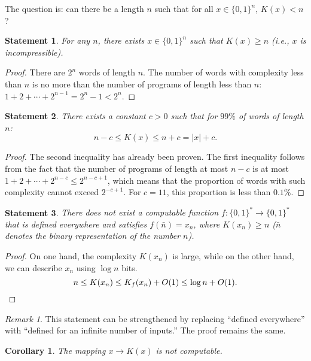 \documentclass[12pt,sans]{article}
\newcommand{\bits}{\{0,1\}}
\newcommand{\bitstr}{\bits^*}
\theoremstyle{definition}
\theoremstyle{plain}
\newtheorem{statement}{Statement}[section]
\newtheorem{corollary}{Corollary}[section]
\theoremstyle{remark}
\newtheorem{remark}{Remark}[section]
\begin{document}
The question is: can there be a length $n$ such that for all $x \in \{0,1\}^n$, $K(x) < n$?
\begin{statement}
    For any $n$, there exists $x \in \{0,1\}^n$ such that $K(x) \ge n$ (i.e., $x$ is incompressible).
\end{statement}
\begin{proof}
    There are $2^n$ words of length $n$. The number of words with complexity less than $n$ is no more than the number of programs of length less than $n$:
    \(
    1 + 2 + \dotsb + 2^{n-1} = 2^n - 1 < 2^n.
    \)\qedhere
\end{proof}

\begin{statement}
    There exists a constant $c > 0$ such that for $99\%$ of words of length $n$:
    \[
    n - c \le K(x) \le n + c = |x| + c.
    \]
\end{statement}
\begin{proof}
    The second inequality has already been proven. The first inequality follows from the fact that the number of programs of length at most $n - c$ is at most $1 + 2 + \dotsb + 2^{n-c} \le 2^{n - c + 1}$, which means that the proportion of words with such complexity cannot exceed $2^{-c + 1}$. For $c = 11$, this proportion is less than $0.1\%$.
\end{proof}

\begin{statement}
    There does not exist a computable function $f:\bitstr\to\bitstr$ that is
    defined everywhere and satisfies $f(\bar n) = x_n$, where $K(x_n) \ge n$ ($\bar n$ denotes the binary representation of the number $n$).
\end{statement}
\begin{proof} On one hand, the complexity $K(x_n)$ is large, while on the other hand, we can describe $x_n$ using $\log n$ bits.
    \[
    n \le K(x_n) \le K_f(x_n) + O(1) \le \log n + O(1). \qedhere
    \]
\end{proof}

\begin{remark}
    This statement can be strengthened by replacing ``defined everywhere'' with ``defined for an infinite number of inputs.'' The proof remains the same.
\end{remark}

\begin{corollary}
    The mapping $x \to K(x)$ is not computable.
\end{corollary}
\end{document}
